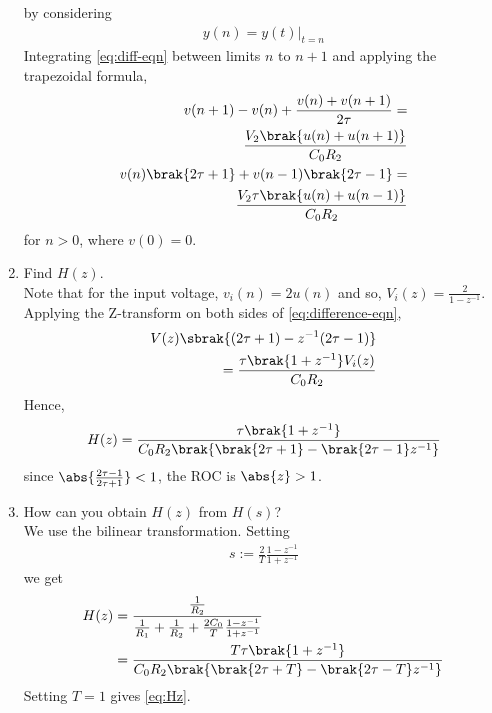 \documentclass[journal,12pt,twocolumn]{IEEEtran}
\renewcommand\thesection{\arabic{section}}
\begin{document}
\begin{enumerate}[label=\arabic*.,ref=\thesection.\theenumi]
by considering 
\begin{align}
	y(n) = y(t)\vert_{t=n}
\end{align}
\solution
Integrating \eqref{eq:diff-eqn} between limits $n$ to $n+1$ 
and applying the trapezoidal formula,
\begin{align}
	v(n+1) - v(n) + \frac{v(n) + v(n+1)}{2\tau} = \nonumber\\
	\frac{V_2\brak{u(n)+u(n+1)}}{C_0R_2} \\
	v(n)\brak{2\tau+1} + v(n-1)\brak{2\tau-1} = \nonumber\\ 
	\frac{V_2\tau\brak{u(n)+u(n-1)}}{C_0R_2}
	\label{eq:difference-eqn}
\end{align}
for $n > 0$, where $v(0) = 0$.
\item Find $H(z)$. \\
\solution
Note that for the input voltage, $v_i(n) = 2u(n)$ and
so, $V_i(z) = \frac{2}{1-z^{-1}}$. Applying the Z-transform
on both sides of \eqref{eq:difference-eqn},
\begin{align}
	V(z)\sbrak{(2\tau + 1) - z^{-1}(2\tau - 1)} \nonumber \\
	= \frac{\tau\brak{1 + z^{-1}}V_i(z)}{C_0R_2}
\end{align}
Hence,
\begin{align}
	H(z) = \frac{\tau\brak{1+z^{-1}}}{C_0R_2\brak{\brak{2\tau+1}-\brak{2\tau-1}z^{-1}}}
	\label{eq:Hz}
\end{align}
since $\abs{\frac{2\tau-1}{2\tau+1}} < 1$, the ROC is $\abs{z} > 1$.
\item How can you obtain $H(z)$ from $H(s)$? \\
\solution
We use the bilinear transformation. Setting
\begin{align}
	s := \frac{2}{T}\frac{1 - z^{-1}}{1 + z^{-1}}
\end{align}
we get
\begin{align}
	H(z) &= \frac{\frac{1}{R_2}}{\frac{1}{R_1} + \frac{1}{R_2} + \frac{2C_0}{T}\frac{1 - z^{-1}}{1 + z^{-1}}} \\
	&= \frac{T\tau\brak{1+z^{-1}}}{C_0R_2\brak{\brak{2\tau+T}-\brak{2\tau-T}z^{-1}}}
\end{align}
Setting $T = 1$ gives \eqref{eq:Hz}.
\end{enumerate}
\end{document}
